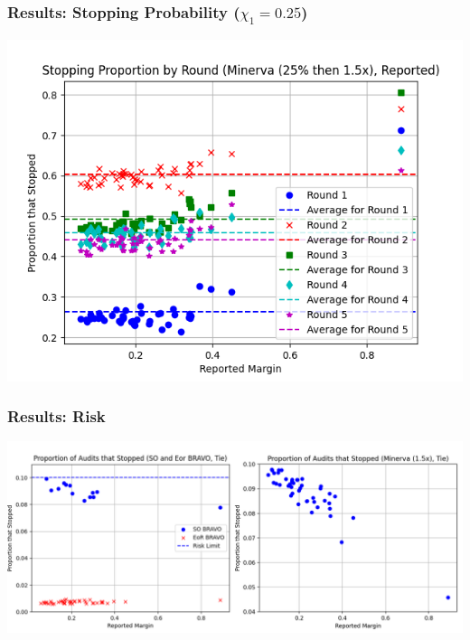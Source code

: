 \documentclass{beamer}
\begin{document}
\begin{frame}
\frametitle{Results: Stopping Probability ($\chi_1=0.25$)}

\includegraphics[width=1\textwidth]{minerva25percthen1p5_sprob.png}
\end{frame}


\begin{frame}
\frametitle{Results: Risk}

\centering
\noindent \includegraphics[width=1.07\textwidth]{both_risk_plots.png}
\end{frame}
\end{document}
